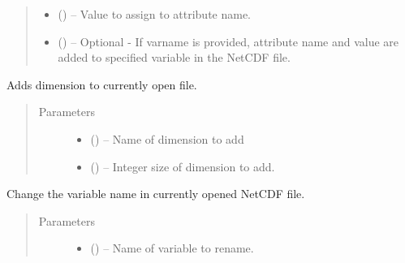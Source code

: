 \documentclass[a4paper,10pt,openany,english]{sphinxmanual}
\begin{document}
\begin{fulllineitems}
\begin{fulllineitems}
\begin{quote}
\begin{description}
\begin{itemize}
\item {} 
 () -- Value to assign to attribute name.

\item {} 
 () -- Optional - If varname is provided, attribute name and value are added to specified
variable in the NetCDF file.

\end{itemize}

\end{description}\end{quote}

\end{fulllineitems}


\begin{fulllineitems}
\label{egadsapi:egads.input.netcdf_io.NetCdf.add_dim}
Adds dimension to currently open file.
\begin{quote}\begin{description}
\item[{Parameters}] \leavevmode\begin{itemize}
\item {} 
 () -- Name of dimension to add

\item {} 
 () -- Integer size of dimension to add.

\end{itemize}

\end{description}\end{quote}

\end{fulllineitems}


\begin{fulllineitems}
\label{egadsapi:egads.input.netcdf_io.NetCdf.change_variable_name}
Change the variable name in currently opened NetCDF file.
\begin{quote}\begin{description}
\item[{Parameters}] \leavevmode\begin{itemize}
\item {} 
 () -- Name of variable to rename.


\end{itemize}
\end{description}
\end{quote}
\end{fulllineitems}
\end{fulllineitems}
\end{document}
